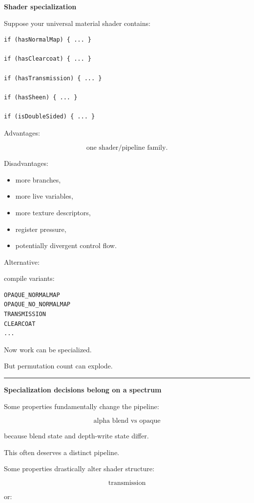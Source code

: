 \textbf{Shader specialization}

Suppose your universal material shader contains:

\begin{verbatim}
if (hasNormalMap) { ... }

if (hasClearcoat) { ... }

if (hasTransmission) { ... }

if (hasSheen) { ... }

if (isDoubleSided) { ... }
\end{verbatim}

Advantages:

\[
\text{one shader/pipeline family}.
\]

Disadvantages:

\begin{itemize}
\tightlist
\item
  more branches,
\item
  more live variables,
\item
  more texture descriptors,
\item
  register pressure,
\item
  potentially divergent control flow.
\end{itemize}

Alternative:

compile variants:

\begin{verbatim}
OPAQUE_NORMALMAP
OPAQUE_NO_NORMALMAP
TRANSMISSION
CLEARCOAT
...
\end{verbatim}

Now work can be specialized.

But permutation count can explode.

\begin{center}\rule{0.5\linewidth}{0.5pt}\end{center}

\textbf{Specialization decisions belong on a spectrum}

Some properties fundamentally change the pipeline:

\[
\text{alpha blend vs opaque}
\]

because blend state and depth-write state differ.

This often deserves a distinct pipeline.

Some properties drastically alter shader structure:

\[
\text{transmission}
\]

or:

